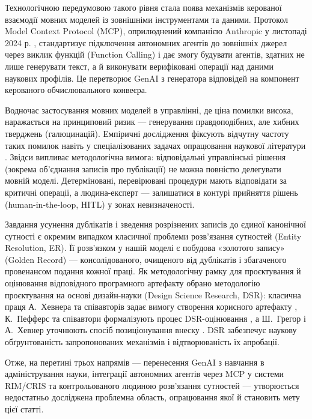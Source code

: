 Технологічною передумовою такого рівня стала поява механізмів керованої взаємодії мовних моделей із зовнішніми інструментами та даними. Протокол Model Context Protocol (MCP), оприлюднений компанією Anthropic у листопаді 2024 р. \cite{Anthropic2024MCP}, стандартизує підключення автономних агентів до зовнішніх джерел через виклик функцій (Function Calling) і дає змогу будувати агентів, здатних не лише генерувати текст, а й виконувати верифіковані операції над даними наукових профілів. Це перетворює GenAI з генератора відповідей на компонент керованого обчислювального конвеєра.

Водночас застосування мовних моделей в управлінні, де ціна помилки висока, наражається на принциповий ризик --- генерування правдоподібних, але хибних тверджень (галюцинацій). Емпіричні дослідження фіксують відчутну частоту таких помилок навіть у спеціалізованих задачах опрацювання наукової літератури \cite{Chelli2024HallucinationRates}. Звідси випливає методологічна вимога: відповідальні управлінські рішення (зокрема об'єднання записів про публікації) не можна повністю делегувати мовній моделі. Детерміновані, перевірювані процедури мають відповідати за критичні операції, а людина-експерт --- залишатися в контурі прийняття рішень (human-in-the-loop, HITL) у зонах невизначеності.

Завдання усунення дублікатів і зведення розрізнених записів до єдиної канонічної сутності є окремим випадком класичної проблеми розв'язання сутностей (Entity Resolution, ER). Її розв'язком у нашій моделі є побудова «золотого запису» (Golden Record) --- консолідованого, очищеного від дублікатів і збагаченого провенансом подання кожної праці. Як методологічну рамку для проєктування й оцінювання відповідного програмного артефакту обрано методологію проєктування на основі дизайн-науки (Design Science Research, DSR): класична праця А.~Хевнера та співавторів задає вимогу створення корисного артефакту \cite{Hevner2004DSR}, К.~Пефферс та співавтори формалізують процес DSR-оцінювання \cite{Peffers2007DSRMeth}, а Ш.~Грегор і А.~Хевнер уточнюють спосіб позиціонування внеску \cite{Gregor2013PositioningDSR}. DSR забезпечує наукову обґрунтованість запропонованих механізмів і відтворюваність їх апробації.

Отже, на перетині трьох напрямів --- перенесення GenAI з навчання в адміністрування науки, інтеграції автономних агентів через MCP у системи RIM/CRIS та контрольованого людиною розв'язання сутностей --- утворюється недостатньо досліджена проблемна область, опрацювання якої й становить мету цієї статті.

